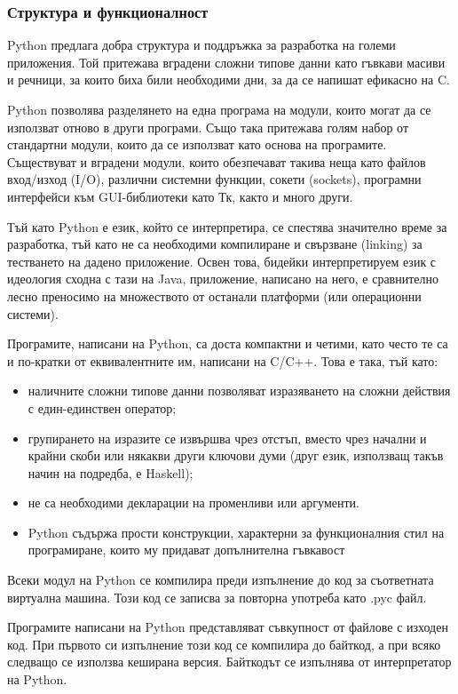 \subsubsection{Структура и функционалност}
Python предлага добра структура и поддръжка за разработка на големи приложения. Той притежава вградени сложни типове данни като гъвкави масиви и речници, за които биха били необходими дни, за да се напишат ефикасно на C.

Python позволява разделянето на една програма на модули, които могат да се използват отново в други програми. Също така притежава голям набор от стандартни модули, които да се използват като основа на програмите. Съществуват и вградени модули, които обезпечават такива неща като файлов вход/изход (I/O), различни системни функции, сокети (sockets), програмни интерфейси към GUI-библиотеки като Тк, както и много други.

Тъй като Python е език, който се интерпретира, се спестява значително време за разработка, тъй като не са необходими компилиране и свързване (linking) за тестването на дадено приложение. Освен това, бидейки интерпретируем език с идеология сходна с тази на Java, приложение, написано на него, е сравнително лесно преносимо на множеството от останали платформи (или операционни системи).

Програмите, написани на Python, са доста компактни и четими, като често те са и по-кратки от еквивалентните им, написани на C/C++. Това е така, тъй като:

\begin{itemize}
\item наличните сложни типове данни позволяват изразяването на сложни действия с един-единствен оператор;
\item групирането на изразите се извършва чрез отстъп, вместо чрез начални и крайни скоби или някакви други ключови думи (друг език, използващ такъв начин на подредба, е Haskell);
\item не са необходими декларации на променливи или аргументи.
\item Python съдържа прости конструкции, характерни за функционалния стил на програмиране, които му придават допълнителна гъвкавост
\end{itemize}

Всеки модул на Python се компилира преди изпълнение до код за съответната виртуална машина. Този код се записва за повторна употреба като .pyc файл.

Програмите написани на Python представляват съвкупност от файлове с изходен код. При първото си изпълнение този код се компилира до байткод, а при всяко следващо се използва кеширана версия. Байткодът се изпълнява от интерпретатор на Python.

